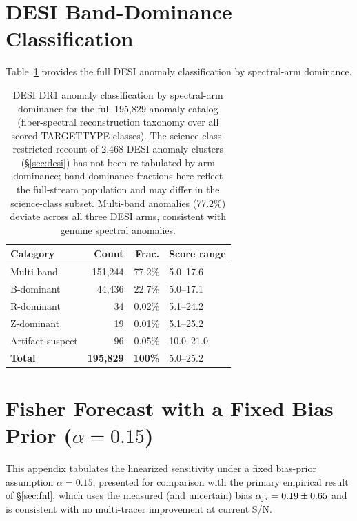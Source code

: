 \documentclass[aps,prd,twocolumn,superscriptaddress,showpacs,preprintnumbers,nofootinbib,longbibliography,floatfix]{revtex4-2}
\begin{document}
\section{DESI Band-Dominance Classification}\label{app:desi_bands}

Table~\ref{tab:desi_bands} provides the full DESI anomaly classification by spectral-arm dominance.

\begin{table}[tb]
\caption{\label{tab:desi_bands} DESI DR1 anomaly classification by spectral-arm dominance for the full 195{,}829-anomaly catalog (fiber-spectral reconstruction taxonomy over all scored TARGETTYPE classes). The science-class-restricted recount of 2{,}468 DESI anomaly clusters (\S\ref{sec:desi}) has not been re-tabulated by arm dominance; band-dominance fractions here reflect the full-stream population and may differ in the science-class subset. Multi-band anomalies (77.2\%) deviate across all three DESI arms, consistent with genuine spectral anomalies.}
\begin{ruledtabular}
\begin{tabular}{lrrl}
\textbf{Category} & \textbf{Count} & \textbf{Frac.} & \textbf{Score range} \\
\hline
Multi-band       & 151{,}244 & 77.2\% & 5.0--17.6 \\
B-dominant       &  44{,}436 & 22.7\% & 5.0--17.1 \\
R-dominant       &      34   &  0.02\% & 5.1--24.2 \\
Z-dominant       &      19   &  0.01\% & 5.1--25.2 \\
Artifact suspect &      96   &  0.05\% & 10.0--21.0 \\
\hline
\textbf{Total}   & \textbf{195{,}829} & \textbf{100\%} & 5.0--25.2 \\
\end{tabular}
\end{ruledtabular}
\end{table}


\section{Fisher Forecast with a Fixed Bias Prior ($\alpha = 0.15$)}\label{app:sensitivity}

This appendix tabulates the linearized sensitivity under a fixed bias-prior assumption $\alpha = 0.15$, presented for comparison with the primary empirical result of \S\ref{sec:fnl}, which uses the measured (and uncertain) bias $\alpha_{\rm jk} = 0.19 \pm 0.65$ and is consistent with no multi-tracer improvement at current S/N.
\end{document}
